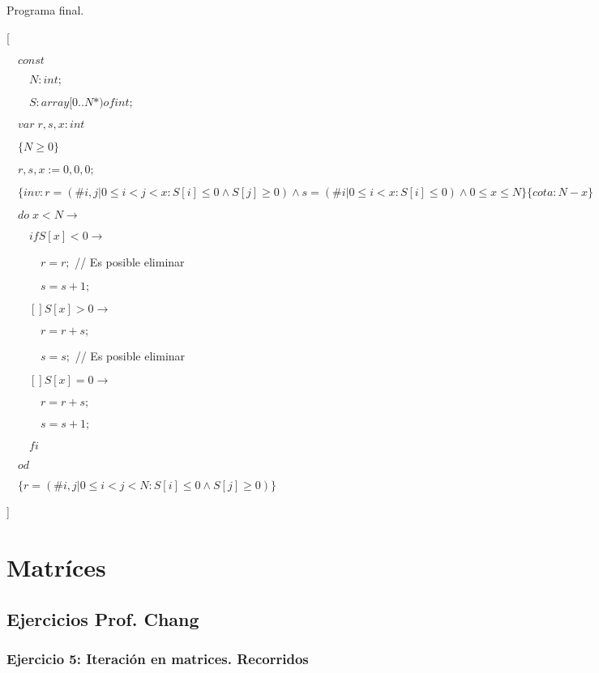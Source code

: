 \documentclass[hidelinks]{article}
\begin{document}
\newpage

Programa final. \par

[\par
$\quad const $\par
$\qquad N: int;$\par
$\qquad S: array[0..N*) of int;$\par
$\quad var \; r, s, x: int$\par
$\quad\{N \geq 0\}$\par
$\quad r, s, x := 0,0,0;$\par
$\quad\{inv: r = (\# i,j| 0\leq i < j < x :S[i] \leq 0 \land S[j] \geq 0) \land s = (\# i| 0\leq i < x :S[i] \leq 0) \land 0 \leq x \leq N\}\{cota: N-x\}$\par
$\quad do \; x < N \rightarrow $ \par
$\qquad if S[x] < 0 \rightarrow $ \par
$\qquad \quad r = r; $ // Es posible eliminar \par
$\qquad \quad s = s+1; $ \par
$\qquad [] S[x] > 0 \rightarrow $ \par
$\qquad \quad r = r+s; $ \par
$\qquad \quad s = s; $ // Es posible eliminar \par
$\qquad [] S[x] = 0 \rightarrow $ \par
$\qquad \quad r = r+s; $ \par
$\qquad \quad s = s+1; $ \par
$\qquad fi $ \par
$\quad od $ \par
$\quad \{r = (\# i,j| 0\leq i < j < N :S[i] \leq 0 \land S[j] \geq 0)\}$ \par
]

\newpage

\section{Matríces}

\subsection{Ejercicios Prof. Chang}


\subsubsection{Ejercicio 5: Iteración en matrices. Recorridos}
\end{document}
